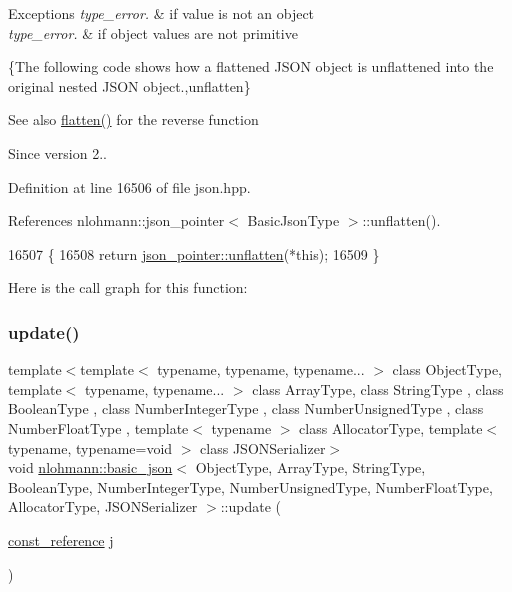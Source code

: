 \begin{DoxyExceptions}{Exceptions}
{\em type\+\_\+error.} & if value is not an object \\
\hline
{\em type\+\_\+error.} & if object values are not primitive\\
\hline
\end{DoxyExceptions}
\{The following code shows how a flattened J\+S\+ON object is unflattened into the original nested J\+S\+ON object.,unflatten\}

\begin{DoxySeeAlso}{See also}
\hyperlink{classnlohmann_1_1basic__json_ab838f000d76662917ffd6ec529569e03}{flatten()} for the reverse function
\end{DoxySeeAlso}
\begin{DoxySince}{Since}
version 2.. 
\end{DoxySince}


Definition at line 16506 of file json.\+hpp.



References nlohmann\+::json\+\_\+pointer$<$ Basic\+Json\+Type $>$\+::unflatten().


\begin{DoxyCode}
16507     \{
16508         \textcolor{keywordflow}{return} \hyperlink{classnlohmann_1_1json__pointer_a920065221e3c81676c3211c100d024a7}{json\_pointer::unflatten}(*\textcolor{keyword}{this});
16509     \}
\end{DoxyCode}
Here is the call graph for this function\+:
\mbox{\label{classnlohmann_1_1basic__json_a1cfa9ae5e7c2434cab4cfe69bffffe11}} 
\subsubsection{\texorpdfstring{update()}{update()}\hspace{0.1cm}{\footnotesize\ttfamily [1/2]}}
{\footnotesize\ttfamily template$<$template$<$ typename, typename, typename... $>$ class Object\+Type, template$<$ typename, typename... $>$ class Array\+Type, class String\+Type , class Boolean\+Type , class Number\+Integer\+Type , class Number\+Unsigned\+Type , class Number\+Float\+Type , template$<$ typename $>$ class Allocator\+Type, template$<$ typename, typename=void $>$ class J\+S\+O\+N\+Serializer$>$ \\
void \hyperlink{classnlohmann_1_1basic__json}{nlohmann\+::basic\+\_\+json}$<$ Object\+Type, Array\+Type, String\+Type, Boolean\+Type, Number\+Integer\+Type, Number\+Unsigned\+Type, Number\+Float\+Type, Allocator\+Type, J\+S\+O\+N\+Serializer $>$\+::update (\begin{DoxyParamCaption}\item[{\hyperlink{classnlohmann_1_1basic__json_a4057c5425f4faacfe39a8046871786ca}{const\+\_\+reference}}]{j }\end{DoxyParamCaption})\hspace{0.3cm}{\ttfamily [inline]}}



